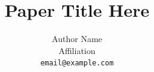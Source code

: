 \documentclass[11pt]{article}
\title{Paper Title Here}
\author{Author Name\\Affiliation\\\texttt{email@example.com}}
\date{}
\theoremstyle{plain}
\theoremstyle{definition}
\theoremstyle{remark}
\begin{document}
\maketitle

\begin{abstract}

\end{abstract}








\appendix

\end{document}
